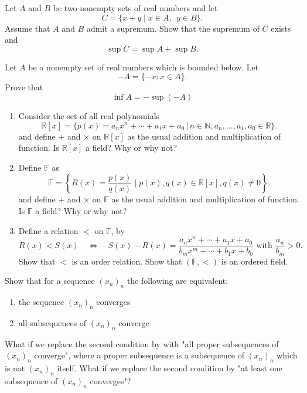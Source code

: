 \documentclass[11pt]{article}%
\newcommand{\st}{\;|\;}
\newcommand{\bigst}{\;\Bigg|\;}
\begin{document}
\begin{Exercise} [title=**$\dagger$]
	Let $A$ and $B$ be two nonempty sets of real numbers and let $$C=\{x+y \st x\in A,\ \ y\in B\}.$$ Assume that $A$ and $B$ admit a supremum. Show that the supremum of $C$ exists and $$\sup C=\sup A +\sup B.$$
\end{Exercise}

\begin{Exercise} [title=**]
	Let $A$ be a nonempty set of real numbers which is bounded below. Let $$-A=\{-x\colon x\in A\}.$$ Prove that $$\inf A=-\sup(-A)$$
\end{Exercise}

\begin{Exercise} [title=***]
	\begin{enumerate}[label={\alph*)}]
		\item Consider the set of all real polynomials
		$$\mathbb{R}[x] = \{ p(x) = a_n x^n + \cdots + a_1 x+ a_0 \, | \, n \in \mathbb{N} , a_n , \dots, a_1, a_0 \in \mathbb{R}\} .$$
		and define $+$ and $\times$ on $\mathbb{R}[x]$ as the usual addition and multiplication of function. Is $\mathbb{R}[x]$ a field? Why or why not?
		\item Define $\mathbb{F}$ as
		$$\mathbb{F}= \left\{ R(x) = \frac{p(x)}{q(x)} \bigst p(x), q(x) \in \mathbb{R}[x], q(x) \neq 0\right\} .$$
		and define $+$ and $\times$ on $\mathbb F$ as the usual addition and multiplication of function. Is $\mathbb{F}$ a field? Why or why not?
		
		\item Define a relation $<$ on $\mathbb{F}$, by
		$$R(x) < S(x) \quad \Leftrightarrow \quad S(x)- R(x) = \frac{a_n x^n + \cdots + a_1 x+ a_0}{b_m x^m + \cdots + b_1 x+ b_0} \text{ with } \frac{a_n}{b_m} >0.$$
		Show that $<$ is an order relation. Show that $(\mathbb{F}, <)$ is an ordered field.
	\end{enumerate}
\end{Exercise}

\begin{Exercise}[title=*$\dagger$]
	Show that for a sequence $(x_n)_n$ the following are equivalent:
	\begin{enumerate}[label={\alph*)}]
		\item the sequence $(x_n)_n$ converges
		\item all subsequences of $(x_n)_n$ converge
	\end{enumerate}
	
	What if we replace the second condition by with "all proper subsequences of $(x_n)_n$ converge", where a proper subsequence is a subsequence of $(x_n)_n$ which is not $(x_n)_n$ itself. What if we replace the second condition by "at least one subsequence of $(x_n)_n$ converges"?
\end{Exercise}
\end{document}
